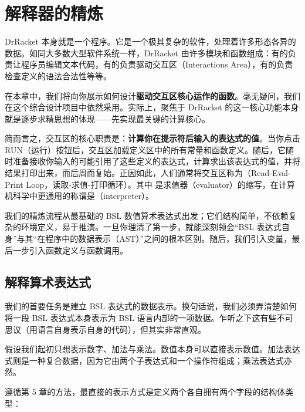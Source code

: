 
\chapter{解释器的精炼}
\label{sec:ch21_interpreters}

DrRacket 本身就是一个程序。它是一个极其复杂的软件，处理着许多形态各异的数据。如同大多数大型软件系统一样，DrRacket 由许多模块和函数组成：有的负责让程序员编辑文本代码，有的负责驱动交互区（Interactions Area），有的负责检查定义的语法合法性等等。

在本章中，我们将向你展示如何设计\textbf{驱动交互区核心运作的函数}。毫无疑问，我们在这个综合设计项目中依然采用。实际上，聚焦于 DrRacket 的这一核心功能本身就是逐步求精思想的体现——先实现最关键的计算核心。

简而言之，交互区的核心职责是：\textbf{计算你在提示符后输入的表达式的值}。当你点击 \textsf{RUN}（运行）按钮后，交互区加载定义区中的所有常量和函数定义。随后，它随时准备接收你输入的可能引用了这些定义的表达式，计算求出该表达式的值，并将结果打印出来，而后周而复始。正因如此，人们通常将交互区称为（Read-Eval-Print Loop，读取-求值-打印循环）。其中  是求值器（evaluator）的缩写，在计算机科学中更通用的称谓是（interpreter）。

我们的精炼流程从最基础的 BSL 数值算术表达式出发；它们结构简单，不依赖复杂的环境定义，易于推演。一旦你理清了第一步，就能深刻领会“BSL 表达式自身”与其“在程序中的数据表示（AST）”之间的根本区别。随后，我们引入变量，最后一步引入函数定义与函数调用。

\section{解释算术表达式 }
\label{sec:21.1_eval_expr}

我们的首要任务是建立 BSL 表达式的数据表示。换句话说，我们必须弄清楚如何将一段 BSL 表达式本身表示为 BSL 语言内部的一项数据。乍听之下这有些不可思议（用语言自身表示自身的代码），但其实非常直观。

假设我们起初只想表示数字、加法与乘法。数值本身可以直接表示数值。加法表达式则是一种复合数据，因为它由两个子表达式和一个操作符组成；乘法表达式亦然。

遵循第 5 章的方法，最直接的表示方式是定义两个各自拥有两个字段的结构体类型：

